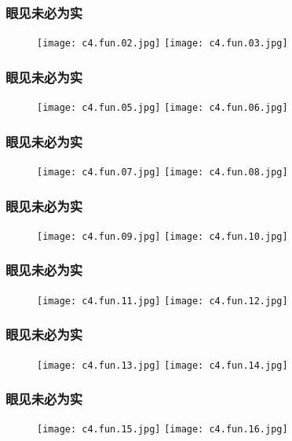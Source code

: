 \begin{frame}
  \frametitle{眼见未必为实}
  \begin{figure}
    \centering
    \texttt{[image: c4.fun.02.jpg]}\quad
    \texttt{[image: c4.fun.03.jpg]}
  \end{figure}
\end{frame}

\begin{frame}
  \frametitle{眼见未必为实}
  \begin{figure}
    \centering
    \texttt{[image: c4.fun.05.jpg]}\quad
    \texttt{[image: c4.fun.06.jpg]}
  \end{figure}
\end{frame}

\begin{frame}
  \frametitle{眼见未必为实}
  \begin{figure}
    \centering
    \texttt{[image: c4.fun.07.jpg]}\quad
    \texttt{[image: c4.fun.08.jpg]}
  \end{figure}
\end{frame}

\begin{frame}
  \frametitle{眼见未必为实}
  \begin{figure}
    \centering
    \texttt{[image: c4.fun.09.jpg]}\quad
    \texttt{[image: c4.fun.10.jpg]}
  \end{figure}
\end{frame}

\begin{frame}
  \frametitle{眼见未必为实}
  \begin{figure}
    \centering
    \texttt{[image: c4.fun.11.jpg]}\quad
    \texttt{[image: c4.fun.12.jpg]}
  \end{figure}
\end{frame}

\begin{frame}
  \frametitle{眼见未必为实}
  \begin{figure}
    \centering
    \texttt{[image: c4.fun.13.jpg]}\quad
    \texttt{[image: c4.fun.14.jpg]}
  \end{figure}
\end{frame}

\begin{frame}
  \frametitle{眼见未必为实}
  \begin{figure}
    \centering
    \texttt{[image: c4.fun.15.jpg]}\quad
    \texttt{[image: c4.fun.16.jpg]}
  \end{figure}
\end{frame}


